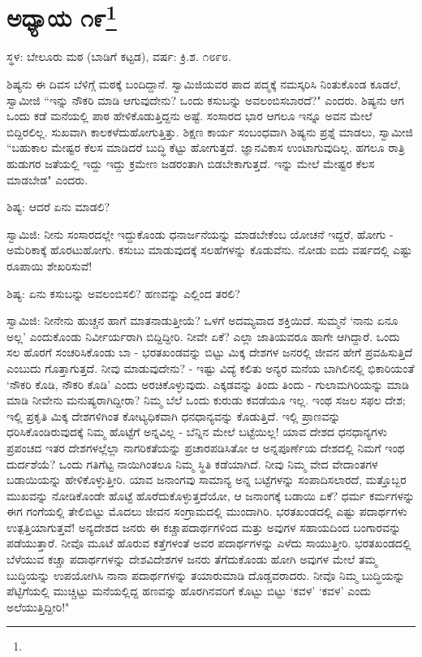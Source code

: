 \newpage

\chapter[ಅಧ್ಯಾಯ ೧೯]{ಅಧ್ಯಾಯ ೧೯\protect\footnote{}}

\centerline{ಸ್ಥಳ: ಬೇಲೂರು ಮಠ (ಬಾಡಿಗೆ ಕಟ್ಟಡ), ವರ್ಷ: ಕ್ರಿ.ಶ. ೧೮೯೮.}

ಶಿಷ್ಯನು ಈ ದಿವಸ ಬೆಳಿಗ್ಗೆ ಮಠಕ್ಕೆ ಬಂದಿದ್ದಾನೆ. ಸ್ವಾಮಿಜಿಯವರ ಪಾದ ಪದ್ಮಕ್ಕೆ ನಮಸ್ಕರಿಸಿ ನಿಂತುಕೊಂಡ ಕೂಡಲೆ, ಸ್ವಾಮೀಜಿ “ಇನ್ನು ನೌಕರಿ ಮಾಡಿ ಆಗುವುದೇನು? ಒಂದು ಕಸುಬನ್ನು ಅವಲಂಬಿಸಬಾರದೆ?" ಎಂದರು. ಶಿಷ್ಯನು ಆಗ ಒಂದು ಕಡೆ ಮನೆಯಲ್ಲಿ ಪಾಠ ಹೇಳಿಕೊಡುತ್ತಿದ್ದನು ಅಷ್ಟೆ. ಸಂಸಾರದ ಭಾರ ಆಗಲೂ ಇನ್ನೂ ಅವನ ಮೇಲೆ ಬಿದ್ದಿರಲಿಲ್ಲ. ಸುಖವಾಗಿ ಕಾಲಕಳೆದುಹೋಗುತ್ತಿತ್ತು. ಶಿಕ್ಷಣ ಕಾರ್ಯ ಸಂಬಂಧವಾಗಿ ಶಿಷ್ಯನು ಪ್ರಶ್ನೆ ಮಾಡಲು, ಸ್ವಾಮೀಜಿ “ಬಹುಕಾಲ ಮೇಷ್ಟರ ಕೆಲಸ ಮಾಡಿದರೆ ಬುದ್ಧಿ ಕೆಟ್ಟು ಹೋಗುತ್ತದೆ. ಜ್ಞಾನವಿಕಾಸ ಉಂಟಾಗುವುದಿಲ್ಲ. ಹಗಲೂ ರಾತ್ರಿ ಹುಡುಗರ ಜತೆಯಲ್ಲಿ ಇದ್ದು ಇದ್ದು ಕ್ರಮೇಣ ಜಡರಂತಾಗಿ ಬಿಡಬೇಕಾಗುತ್ತದೆ. ಇನ್ನು ಮೇಲೆ ಮೇಷ್ಟರ ಕೆಲಸ ಮಾಡಬೇಡ" ಎಂದರು.

ಶಿಷ್ಯ: ಆದರೆ ಏನು ಮಾಡಲಿ?

ಸ್ವಾಮಿಜಿ: ನೀನು ಸಂಸಾರದಲ್ಲೇ ಇದ್ದುಕೊಂಡು ಧನಾರ್ಜನೆಯನ್ನು ಮಾಡಬೇಕೆಂಬ ಯೋಚನೆ ಇದ್ದರೆ, ಹೋಗು - ಅಮೆರಿಕಾಕ್ಕೆ ಹೊರಟುಹೋಗು. ಕಸುಬು ಮಾಡುವುದಕ್ಕೆ ಸಲಹೆಗಳನ್ನು ಕೊಡುವೆನು. ನೋಡು ಐದು ವರ್ಷದಲ್ಲಿ ಎಷ್ಟು ರೂಪಾಯಿ ಶೇಖರಿಸುವೆ!

ಶಿಷ್ಯ: ಏನು ಕಸುಬನ್ನು ಅವಲಂಬಿಸಲಿ? ಹಣವನ್ನು ಎಲ್ಲಿಂದ ತರಲಿ?

ಸ್ವಾಮಿಜಿ: ನೀನೇನು ಹುಚ್ಚನ ಹಾಗೆ ಮಾತನಾಡುತ್ತೀಯೆ? ಒಳಗೆ ಅದಮ್ಯವಾದ ಶಕ್ತಿಯಿದೆ. ಸುಮ್ಮನೆ ‘ನಾನು ಏನೂ ಅಲ್ಲ’ ಎಂದುಕೊಂಡು ನಿರ್ವೀರ್ಯರಾಗಿ ಬಿದ್ದಿದ್ದೀರಿ. ನೀವೇ ಏಕೆ? ಎಲ್ಲಾ ಜಾತಿಯವರೂ ಹಾಗೇ ಆಗಿದ್ದಾರೆ. ಒಂದು ಸಲ ಹೊರಗೆ ಸಂಚರಿಸಿಕೊಂಡು ಬಾ - ಭರತಖಂಡವನ್ನು ಬಿಟ್ಟು ಮಿಕ್ಕ ದೇಶಗಳ ಜನರಲ್ಲಿ ಜೀವನ ಹೇಗೆ ಪ್ರವಹಿಸುತ್ತಿದೆ ಎಂಬುದು ಗೊತ್ತಾಗುತ್ತದೆ. ನೀವು ಮಾಡುವುದೇನು? - ಇಷ್ಟು ವಿದ್ಯೆ ಕಲಿತು ಅನ್ಯರ ಮನೆಯ ಬಾಗಿಲಿನಲ್ಲಿ ಭಿಕಾರಿಯಂತೆ ‘ನೌಕರಿ ಕೊಡಿ, ನೌಕರಿ ಕೊಡಿ’ ಎಂದು ಅರಚಿಕೊಳ್ಳುವುದು. ಎಕ್ಕಡವನ್ನು ತಿಂದು ತಿಂದು - ಗುಲಾಮಗಿರಿಯನ್ನು ಮಾಡಿ ಮಾಡಿ ನೀವೇನು ಮನುಷ್ಯರಾಗಿದ್ದೀರಾ? ನಿಮ್ಮ ಬೆಲೆ ಒಂದು ಕುರುಡು ಕವಡೆಯೂ ಇಲ್ಲ. ಇಂಥ ಸಜಲ ಸಫಲ ದೇಶ; ಇಲ್ಲಿ ಪ್ರಕೃತಿ ಮಿಕ್ಕ ದೇಶಗಳಿಗಿಂತ ಕೋಟ್ಯಧಿಕವಾಗಿ ಧನಧಾನ್ಯವನ್ನು ಕೊಡುತ್ತಿದೆ. ಇಲ್ಲಿ ಪ್ರಾಣವನ್ನು ಧರಿಸಿಕೊಂಡಿರುವುದಕ್ಕೆ ನಿಮ್ಮ ಹೊಟ್ಟೆಗೆ ಅನ್ನವಿಲ್ಲ - ಬೆನ್ನಿನ ಮೇಲೆ ಬಟ್ಟೆಯಿಲ್ಲ! ಯಾವ ದೇಶದ ಧನಧಾನ್ಯಗಳು ಪ್ರಪಂಚದ ಇತರ ದೇಶಗಳಲ್ಲೆಲ್ಲಾ ನಾಗರಿಕತೆಯನ್ನು ಪ್ರಚಾರಪಡಿಸಿತೋ ಆ ಅನ್ನಪೂರ್ಣೆಯ ದೇಶದಲ್ಲಿ ನಿಮಗೆ ಇಂಥ ದುರ್ದಶೆಯೆ? ಒಂದು ಗತಿಗೆಟ್ಟ ನಾಯಿಗಿಂತಲೂ ನಿಮ್ಮ ಸ್ಥಿತಿ ಕಡೆಯಾಗಿದೆ. ನೀವು ನಿಮ್ಮ ವೇದ ವೇದಾಂತಗಳ ಬಡಾಯಿಯನ್ನು ಹೇಳಿಕೊಳ್ಳುತ್ತೀರಿ. ಯಾವ ಜನಾಂಗವು ಸಾಮಾನ್ಯ ಅನ್ನ ಬಟ್ಟೆಗಳನ್ನು ಸಂಪಾದಿಸಲಾರದೆ, ಮತ್ತೊಬ್ಬರ ಮುಖವನ್ನು ನೋಡಿಕೊಂಡೇ ಹೊಟ್ಟೆ ಹೊರೆದುಕೊಳ್ಳುತ್ತದೆಯೋ, ಆ ಜನಾಂಗಕ್ಕೆ ಬಡಾಯಿ ಏಕೆ? ಧರ್ಮ ಕರ್ಮಗಳನ್ನು ಈಗ ಗಂಗೆಯಲ್ಲಿ ತೇಲಿಬಿಟ್ಟು ಮೊದಲು ಜೀವನ ಸಂಗ್ರಾಮದಲ್ಲಿ ಮುಂದಾಗಿರಿ. ಭರತಖಂಡದಲ್ಲಿ ಎಷ್ಟು ಪದಾರ್ಥಗಳು ಉತ್ಪತ್ತಿಯಾಗುತ್ತವೆ! ಅನ್ಯದೇಶದ ಜನರು ಈ ಕಚ್ಚಾಪದಾರ್ಥಗಳಿಂದ ಮತ್ತು ಅವುಗಳ ಸಹಾಯದಿಂದ ಬಂಗಾರವನ್ನು ಪಡೆಯುತ್ತಾರೆ. ನೀವೊ ಮೂಟೆ ಹೊರುವ ಕತ್ತೆಗಳಂತೆ ಅವರ ಪದಾರ್ಥಗಳನ್ನು ಎಳೆದು ಸಾಯುತ್ತೀರಿ. ಭರತಖಂಡದಲ್ಲಿ ಬೆಳೆಯುವ ಕಚ್ಚಾ ಪದಾರ್ಥಗಳನ್ನು ದೇಶವಿದೇಶಗಳ ಜನರು ತೆಗೆದುಕೊಂಡು ಹೋಗಿ ಅವುಗಳ ಮೇಲೆ ತಮ್ಮ ಬುದ್ಧಿಯನ್ನು ಉಪಯೋಗಿಸಿ ನಾನಾ ಪದಾರ್ಥಗಳನ್ನು ತಯಾರುಮಾಡಿ ದೊಡ್ಡವರಾದರು. ನೀವೊ ನಿಮ್ಮ ಬುದ್ಧಿಯನ್ನು ಪೆಟ್ಟಿಗೆಯಲ್ಲಿ ಮುಚ್ಚಿಟ್ಟು ಮನೆಯಲ್ಲಿದ್ದ ಹಣವನ್ನು ಹೊರಗಿನವರಿಗೆ ಕೊಟ್ಟು ಬಿಟ್ಟು ‘ಕವಳ’ ‘ಕವಳ’ ಎಂದು ಅಲೆಯುತ್ತಿದ್ದೀರಿ!"

